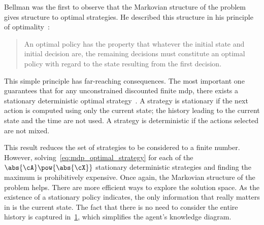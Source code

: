 Bellman was the first to observe that the Markovian structure of the problem gives structure to optimal strategies.
He described this structure in his principle of optimality~\cite{bellman:1957}:
\begin{quote}
An optimal policy has the property that whatever the initial state and initial decision are, the remaining decisions must constitute an optimal policy with regard to the state resulting from the first decision.
\end{quote}
This simple principle has far-reaching consequences.
The most important one guarantees that for any unconstrained discounted finite \ac{mdp}, there exists a stationary deterministic optimal strategy~\cite[Theorem~6.2.10]{puterman:1994}.
A strategy is stationary if the next action is computed using only the current state; the history leading to the current state and the time are not used.
A strategy is deterministic if the actions selected are not mixed.

This result reduces the set of strategies to be considered to a finite number.
However, solving~\cref{eq:mdp_optimal_strategy} for each of the~\(\abs{\cA} \pow {\abs{\cX}}\) stationary deterministic strategies and finding the maximum is prohibitively expensive.
Once again, the Markovian structure of the problem helps.
There are more efficient ways to explore the solution space.
As the existence of a stationary policy indicates, the only information that really matters in  is the current state.
The fact that there is no need to consider the entire history is captured in~\cref{fig:agent_knowledge_mdp_state}, which simplifies the agent's knowledge diagram.

\begin{figure}[htp]
\centering
{}
\label{fig:agent_knowledge_mdp_state}
\end{figure}

